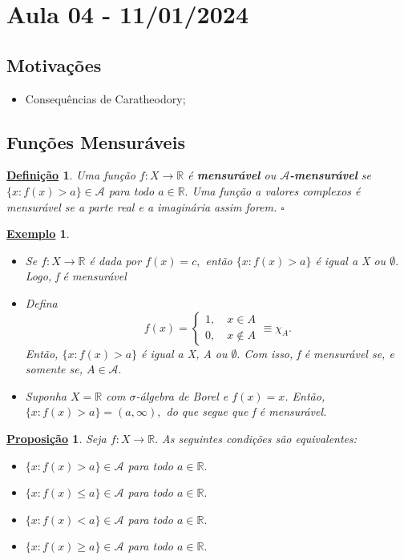 \documentclass{article}
\newtheorem*{def*}{\underline{Defini\c c\~ao}}
\newtheorem*{prop*}{\underline{Proposi\c c\~ao}}
\newtheorem{example}{\underline{Exemplo}}
\begin{document}
\section{Aula 04 - 11/01/2024}
\subsection{Motivações}
\begin{itemize}
  \item Consequências de Caratheodory;
\end{itemize}
\subsection{Funções Mensuráveis}
\begin{def*}
  Uma função \(f:X\rightarrow \mathbb{R}\) é \textbf{mensurável} ou \(\mathcal{A}\)\textbf{-mensurável} se \(\{x: f(x) > a\}\in \mathcal{A}\) para todo \(a\in \mathbb{R}.\) Uma função 
a valores complexos é mensurável se a parte real e a imaginária assim forem. \(\square\)
\end{def*}
\begin{example}
 \begin{itemize}
   \item[1)] Se \(f:X\rightarrow \mathbb{R}\) é dada por \(f(x) = c,\) então \(\{x: f(x) > a\}\) é igual a X ou \(\emptyset .\) Logo, f é mensurável
     \item[2)] Defina 
       \[
         f(x)  = \left\{\begin{array}{ll}
             1,\quad x\in A\\ 
             0,\quad x\not\in A
           \end{array}\right.\equiv \chi_{A}.
       \]
      Então, \(\{x: f(x) > a\}\) é igual a X, A ou \(\emptyset .\) Com isso, f é mensurável se, e somente se, \(A\in \mathcal{A}.\)
      \item[3)] Suponha \(X = \mathbb{R}\) com \(\sigma \)-álgebra de Borel e \(f(x) = x\). Então, \(\{x: f(x) > a\} = (a, \infty),\) do que 
        segue que f é mensurável.
 \end{itemize}
\end{example}
\begin{prop*}
  Seja \(f:X\rightarrow \mathbb{R}.\) As seguintes condições são equivalentes: 
 \begin{itemize}
   \item[i)] \(\{x: f(x) > a\}\in \mathcal{A}\) para todo \(a\in \mathbb{R}.\)
   \item[ii)] \(\{x: f(x) \leq  a\}\in \mathcal{A}\) para todo \(a\in \mathbb{R}.\)
   \item[iii)] \(\{x: f(x) < a\}\in \mathcal{A}\) para todo \(a\in \mathbb{R}.\)
   \item[iv)] \(\{x: f(x) \geq  a\}\in \mathcal{A}\) para todo \(a\in \mathbb{R}.\)
 \end{itemize}
\end{prop*}
\end{document}
